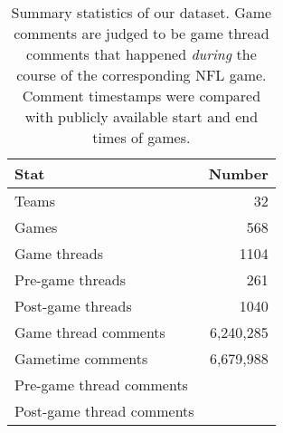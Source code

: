 \begin{table}[t]
    \centering
    \begin{tabular}{lr}
        \toprule
        \textbf{Stat} & \textbf{Number} \\\midrule
        Teams & 32 \\ \midrule
        Games & 568 \\ \midrule
        Game threads & 1104 \\ \midrule
        Pre-game threads & 261 \\ \midrule
        Post-game threads & 1040 \\ \midrule
        Game thread comments  & 6,240,285 \\ \midrule
        Gametime comments & 6,679,988 \\ \midrule
        Pre-game thread comments &  \\\midrule
        Post-game thread comments &  \\\bottomrule
    \end{tabular}
    \caption{Summary statistics of our dataset. Game comments are judged to be game thread comments that happened \emph{during} the course of the corresponding NFL game. Comment timestamps were compared with publicly available start and end times of games.}
    \label{tab:football-stats}
\end{table}
